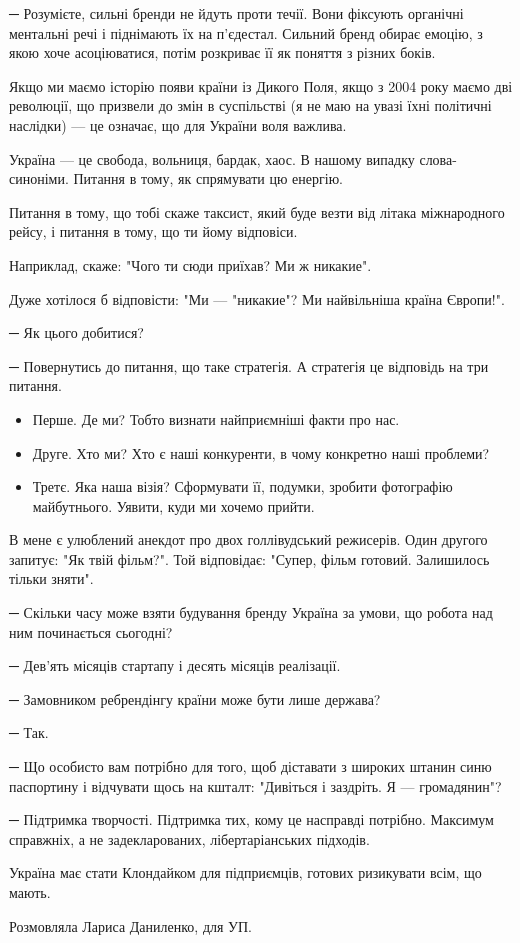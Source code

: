 ─ Розумієте, сильні бренди не йдуть проти течії. Вони фіксують органічні
ментальні речі і піднімають їх на п’єдестал. Сильний бренд обирає емоцію, з
якою хоче асоціюватися, потім розкриває її як поняття з різних боків.

Якщо ми маємо історію появи країни із Дикого Поля, якщо з 2004 року маємо дві
революції, що призвели до змін в суспільстві (я не маю на увазі їхні політичні
наслідки) --- це означає, що для України воля важлива. 

Україна --- це свобода, вольниця, бардак, хаос. В нашому випадку слова-синоніми.
Питання в тому, як спрямувати цю енергію. 

Питання в тому, що тобі скаже таксист, який буде везти від літака міжнародного
рейсу, і питання в тому, що ти йому відповіси.

Наприклад, скаже: "Чого ти сюди приїхав? Ми ж никакие".

Дуже хотілося б відповісти: "Ми --- "никакие"? Ми найвільніша країна Європи!".

─ Як цього добитися?

─ Повернутись до питання, що таке стратегія. А стратегія це відповідь на три
питання.

\begin{itemize}
	\item Перше. Де ми? Тобто визнати найприємніші факти про нас.
	\item Друге. Хто ми? Хто є наші конкуренти, в чому конкретно наші проблеми?
	\item Третє. Яка наша візія? Сформувати її, подумки, зробити фотографію майбутнього. Уявити, куди ми хочемо прийти.
\end{itemize}

В мене є улюблений анекдот про двох голлівудський режисерів. Один другого
запитує: "Як твій фільм?". Той відповідає: "Супер, фільм готовий. Залишилось
тільки зняти".

─ Скільки часу може взяти будування бренду Україна за умови, що робота над ним
починається сьогодні?

─ Дев’ять місяців стартапу і десять місяців реалізації.

─ Замовником ребрендінгу країни може бути лише держава?

─ Так.

─ Що особисто вам потрібно для того, щоб діставати з широких штанин синю
паспортину і відчувати щось на кшталт: "Дивіться і заздріть. Я --- громадянин"?

─ Підтримка творчості. Підтримка тих, кому це насправді потрібно. Максимум
справжніх, а не задекларованих, лібертаріанських підходів. 

Україна має стати Клондайком для підприємців, готових ризикувати всім, що
мають. 

Розмовляла Лариса Даниленко, для УП.
